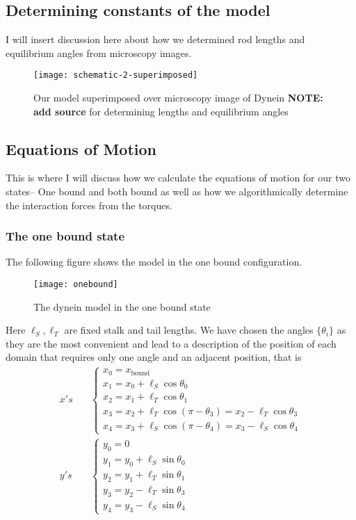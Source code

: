 	\subsection{Determining constants of the model}
	I will insert discussion here about how we determined rod lengths and equilibrium angles from microscopy images. \\
	
	\begin{figure}[hbt!]
		\centering
		\texttt{[image: schematic-2-superimposed]}
		\caption{Our model superimposed over microscopy image of Dynein \textbf{NOTE: add source} for determining lengths and equilibrium angles} 
		\label{fig:superimpmosed}
	\end{figure}
	\subsection{Equations of Motion}
	This is where I will discuss how we calculate the equations of motion for our two states-- One bound and both bound as well as how we algorithmically determine the interaction forces from the torques. 
	
		\subsubsection{The one bound state}
		The following figure shows the model in the one bound configuration.\\
		\begin{figure}[!hbt]
			\centering
			\texttt{[image: onebound]}
			\caption{The dynein model in the one bound state } 
		\end{figure}
		
		\noindent Here $\ell_S, \ell_T$ are fixed stalk and tail lengths. We have chosen the angles $\{\theta_i\}$ as they are the most convenient and lead to a description of the position of each domain that requires only one angle and an adjacent position, that is
		\begin{align}
		x's \quad &\begin{cases}
		x_0 = x_\text{bound} \\
		x_1 = x_0 + \ell_S \cos\theta_0 \\
		x_2 = x_1 + \ell_T \cos\theta_1 \\
		x_3 = x_2 + \ell_T \cos(\pi-\theta_3) = x_2 - \ell_T\cos\theta_3 \\
		x_4 = x_3 + \ell_S \cos(\pi-\theta_4) = x_3 - \ell_S\cos\theta_4
		\end{cases} \\
		y's \quad &\begin{cases}
		y_0 = 0 \\
		y_1 = y_0 + \ell_S\sin\theta_0 \\
		y_2 = y_1 + \ell_T\sin\theta_1 \\
		y_3 = y_2 - \ell_T\sin\theta_3 \\
		y_4 = y_3 - \ell_S\sin\theta_4 
		\end{cases}
		\end{align} 
		
